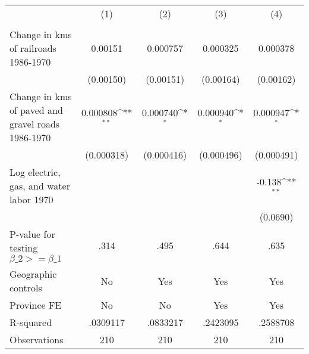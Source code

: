{
\def\sym#1{\ifmmode^{#1}\else\(^{#1}\)\fi}
\begin{tabular}{l*{4}{c}}
\hline\hline
                &\multicolumn{1}{c}{(1)}&\multicolumn{1}{c}{(2)}&\multicolumn{1}{c}{(3)}&\multicolumn{1}{c}{(4)}\\
                &\multicolumn{1}{c}{}&\multicolumn{1}{c}{}&\multicolumn{1}{c}{}&\multicolumn{1}{c}{}\\
\hline
Change in kms of railroads 1986-1970&  0.00151         & 0.000757         & 0.000325         & 0.000378         \\
                &(0.00150)         &(0.00151)         &(0.00164)         &(0.00162)         \\
[1em]
Change in kms of paved and gravel roads 1986-1970& 0.000808\sym{**} & 0.000740\sym{*}  & 0.000940\sym{*}  & 0.000947\sym{*}  \\
                &(0.000318)         &(0.000416)         &(0.000496)         &(0.000491)         \\
[1em]
Log electric, gas, and water labor 1970&                  &                  &                  &   -0.138\sym{**} \\
                &                  &                  &                  & (0.0690)         \\
\hline
P-value for testing $\beta\_{2} >= \beta\_{1}$&     .314         &     .495         &     .644         &     .635         \\
Geographic controls&       No         &      Yes         &      Yes         &      Yes         \\
Province FE     &       No         &       No         &      Yes         &      Yes         \\
R-squared       & .0309117         & .0833217         & .2423095         & .2588708         \\
Observations    &      210         &      210         &      210         &      210         \\
\hline\hline
\end{tabular}
}
